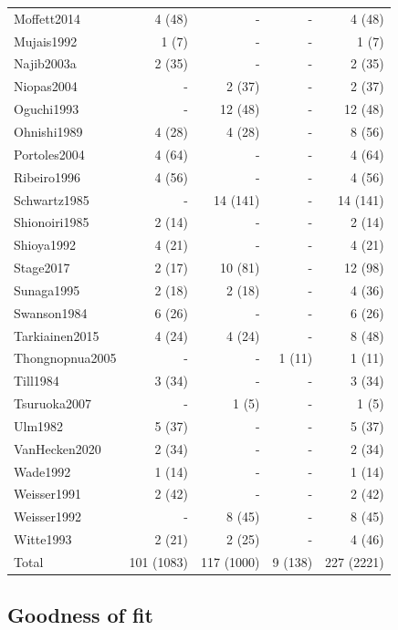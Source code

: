 \documentclass{article}
\begin{document}
\begin{longtable}{lrrrr}
Moffett2014 & 4 (48) & - & - & 4 (48) \\
Mujais1992 & 1 (7) & - & - & 1 (7) \\
Najib2003a & 2 (35) & - & - & 2 (35) \\
Niopas2004 & - & 2 (37) & - & 2 (37) \\
Oguchi1993 & - & 12 (48) & - & 12 (48) \\
Ohnishi1989 & 4 (28) & 4 (28) & - & 8 (56) \\
Portoles2004 & 4 (64) & - & - & 4 (64) \\
Ribeiro1996 & 4 (56) & - & - & 4 (56) \\
Schwartz1985 & - & 14 (141) & - & 14 (141) \\
Shionoiri1985 & 2 (14) & - & - & 2 (14) \\
Shioya1992 & 4 (21) & - & - & 4 (21) \\
Stage2017 & 2 (17) & 10 (81) & - & 12 (98) \\
Sunaga1995 & 2 (18) & 2 (18) & - & 4 (36) \\
Swanson1984 & 6 (26) & - & - & 6 (26) \\
Tarkiainen2015 & 4 (24) & 4 (24) & - & 8 (48) \\
Thongnopnua2005 & - & - & 1 (11) & 1 (11) \\
Till1984 & 3 (34) & - & - & 3 (34) \\
Tsuruoka2007 & - & 1 (5) & - & 1 (5) \\
Ulm1982 & 5 (37) & - & - & 5 (37) \\
VanHecken2020 & 2 (34) & - & - & 2 (34) \\
Wade1992 & 1 (14) & - & - & 1 (14) \\
Weisser1991 & 2 (42) & - & - & 2 (42) \\
Weisser1992 & - & 8 (45) & - & 8 (45) \\
Witte1993 & 2 (21) & 2 (25) & - & 4 (46) \\
Total & 101 (1083) & 117 (1000) & 9 (138) & 227 (2221) \\
\end{longtable}

\subsection{Goodness of fit}
\end{document}
